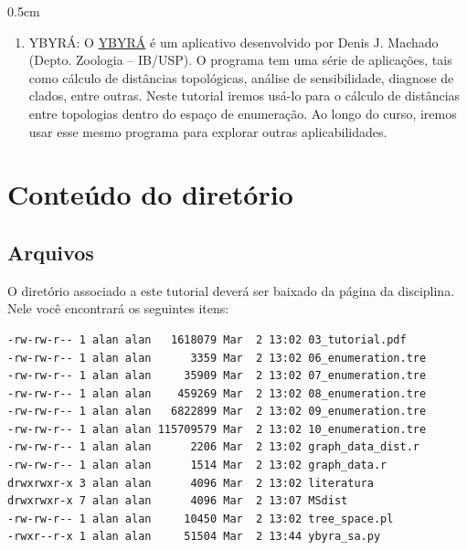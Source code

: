 \begin{refsection}
\begin {myindentpar}{0.5cm}
\begin{enumerate}[\itshape i.]
	\item{YBYRÁ:}\label{tut3:require:ybyra} O \href{http://www.ib.usp.br/grant/anfibios/researchSoftware.html/}{YBYRÁ} \parencite{Machado_2014} é um aplicativo desenvolvido por Denis J. Machado (Depto. Zoologia -- IB/USP). O programa tem uma série de aplicações, tais como cálculo de distâncias topológicas, análise de sensibilidade, diagnose de clados, entre outras. Neste tutorial iremos usá-lo para o cálculo de distâncias entre topologias dentro do espaço de enumeração. Ao longo do curso, iremos usar esse mesmo programa para explorar outras aplicabilidades.


\end{enumerate}
\end{myindentpar}


\section{Conteúdo do diretório}\label{tut3:containt}

\subsection{Arquivos}\label{tut3:containt:arq}
	O diretório associado a este tutorial deverá ser baixado da página da disciplina. Nele você encontrará os seguintes itens:\\

\begin{lstlisting}[label=tut3:ls1]
-rw-rw-r-- 1 alan alan   1618079 Mar  2 13:02 03_tutorial.pdf
-rw-rw-r-- 1 alan alan      3359 Mar  2 13:02 06_enumeration.tre
-rw-rw-r-- 1 alan alan     35909 Mar  2 13:02 07_enumeration.tre
-rw-rw-r-- 1 alan alan    459269 Mar  2 13:02 08_enumeration.tre
-rw-rw-r-- 1 alan alan   6822899 Mar  2 13:02 09_enumeration.tre
-rw-rw-r-- 1 alan alan 115709579 Mar  2 13:02 10_enumeration.tre
-rw-rw-r-- 1 alan alan      2206 Mar  2 13:02 graph_data_dist.r
-rw-rw-r-- 1 alan alan      1514 Mar  2 13:02 graph_data.r
drwxrwxr-x 3 alan alan      4096 Mar  2 13:02 literatura
drwxrwxr-x 7 alan alan      4096 Mar  2 13:07 MSdist
-rw-rw-r-- 1 alan alan     10450 Mar  2 13:02 tree_space.pl
-rwxr--r-x 1 alan alan     51504 Mar  2 13:44 ybyra_sa.py
\end{lstlisting}


\end{refsection}
